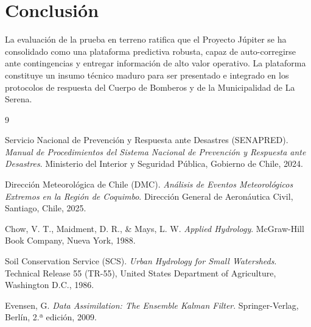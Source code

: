\documentclass[11pt,a4paper]{article}
\begin{document}
\section{Conclusión}

La evaluación de la prueba en terreno ratifica que el Proyecto Júpiter se ha consolidado como una plataforma predictiva robusta, capaz de auto-corregirse ante contingencias y entregar información de alto valor operativo. La plataforma constituye un insumo técnico maduro para ser presentado e integrado en los protocolos de respuesta del Cuerpo de Bomberos y de la Municipalidad de La Serena.

\begin{thebibliography}{9}

Servicio Nacional de Prevención y Respuesta ante Desastres (SENAPRED).
\textit{Manual de Procedimientos del Sistema Nacional de Prevención y Respuesta ante Desastres}.
Ministerio del Interior y Seguridad Pública, Gobierno de Chile, 2024.

Dirección Meteorológica de Chile (DMC).
\textit{Análisis de Eventos Meteorológicos Extremos en la Región de Coquimbo}.
Dirección General de Aeronáutica Civil, Santiago, Chile, 2025.

Chow, V. T., Maidment, D. R., \& Mays, L. W.
\textit{Applied Hydrology}.
McGraw-Hill Book Company, Nueva York, 1988.

Soil Conservation Service (SCS).
\textit{Urban Hydrology for Small Watersheds}.
Technical Release 55 (TR-55), United States Department of Agriculture, Washington D.C., 1986.

Evensen, G.
\textit{Data Assimilation: The Ensemble Kalman Filter}.
Springer-Verlag, Berlín, 2.ª edición, 2009.

\end{thebibliography}
\end{document}
